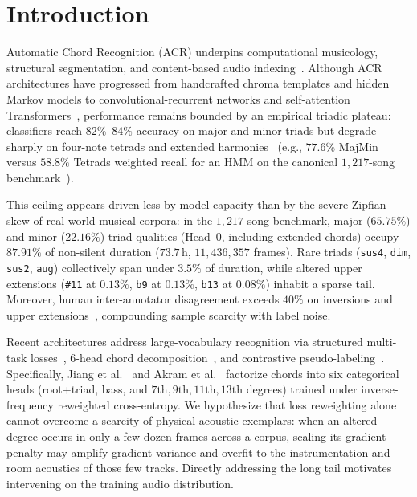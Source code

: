 \section{Introduction}\label{sec:intro}

Automatic Chord Recognition (ACR) underpins computational musicology, structural segmentation, and content-based audio indexing~\cite{pauwels2019twenty}. Although ACR architectures have progressed from handcrafted chroma templates and hidden Markov models to convolutional-recurrent networks and self-attention Transformers~\cite{korzeniowski2016feature,park2019btc,gulati2020conformer}, performance remains bounded by an empirical triadic plateau: classifiers reach $82\%$--$84\%$ accuracy on major and minor triads but degrade sharply on four-note tetrads and extended harmonies~\cite{pauwels2019twenty} (e.g., $77.6\%$ MajMin versus $58.8\%$ Tetrads weighted recall for an HMM on the canonical $1{,}217$-song benchmark~\cite{humphrey2015four}).

This ceiling appears driven less by model capacity than by the severe Zipfian skew of real-world musical corpora: in the $1{,}217$-song benchmark, major ($65.75\%$) and minor ($22.16\%$) triad qualities (Head~0, including extended chords) occupy $87.91\%$ of non-silent duration ($73.7\,\text{h}$, $11{,}436{,}357$ frames). Rare triads ({\small\texttt{sus4}}, {\small\texttt{dim}}, {\small\texttt{sus2}}, {\small\texttt{aug}}) collectively span under $3.5\%$ of duration, while altered upper extensions ({\small\texttt{\#11}} at $0.13\%$, {\small\texttt{b9}} at $0.13\%$, {\small\texttt{b13}} at $0.08\%$) inhabit a sparse tail. Moreover, human inter-annotator disagreement exceeds $40\%$ on inversions and upper extensions~\cite{koops2019annotator}, compounding sample scarcity with label noise.

Recent architectures address large-vocabulary recognition via structured multi-task losses~\cite{mcfee2017structured}, 6-head chord decomposition~\cite{jiang2019large,akram2026chordformer}, and contrastive pseudo-labeling~\cite{li2025large}. Specifically, Jiang et al.~\cite{jiang2019large} and Akram et al.~\cite{akram2026chordformer} factorize chords into six categorical heads (root+triad, bass, and $7\text{th}, 9\text{th}, 11\text{th}, 13\text{th}$ degrees) trained under inverse-frequency reweighted cross-entropy. We hypothesize that loss reweighting alone cannot overcome a scarcity of physical acoustic exemplars: when an altered degree occurs in only a few dozen frames across a corpus, scaling its gradient penalty may amplify gradient variance and overfit to the instrumentation and room acoustics of those few tracks. Directly addressing the long tail motivates intervening on the training audio distribution.

